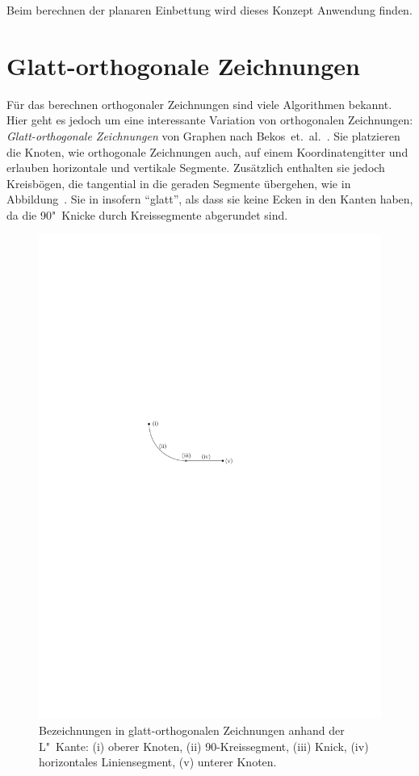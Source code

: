 \documentclass[a4paper]{scrreprt}
\theoremstyle{definition}
\begin{document}
Beim berechnen der planaren Einbettung wird dieses Konzept Anwendung finden.


\section{Glatt-orthogonale Zeichnungen}

Für das berechnen orthogonaler Zeichnungen sind viele Algorithmen bekannt. Hier geht es jedoch um eine interessante Variation von orthogonalen Zeichnungen: \emph{Glatt-orthogonale Zeichnungen} von Graphen nach Bekos~et.~al.~\cite{bekos-13}. Sie platzieren die Knoten, wie orthogonale Zeichnungen auch, auf einem Koordinatengitter und erlauben horizontale und vertikale Segmente. Zusätzlich enthalten sie jedoch Kreisbögen, die tangential in die geraden Segmente übergehen, wie in Abbildung~\label{ref:cutLslopecorrection}. Sie in insofern "`glatt"', als dass sie keine Ecken in den Kanten haben, da die 90\textdegree"~Knicke durch Kreissegmente abgerundet sind.

\begin{figure}[h]
  \centering
  \includegraphics{anatomieLKante}
  \caption{Bezeichnungen in glatt-orthogonalen Zeichnungen anhand der L"~Kante: (i) oberer Knoten, (ii) 90\textdegree-Kreissegment, (iii) Knick, (iv) horizontales Liniensegment, (v) unterer Knoten.}
  \label{fig:cutLslopecorrection}
\end{figure}
\end{document}
